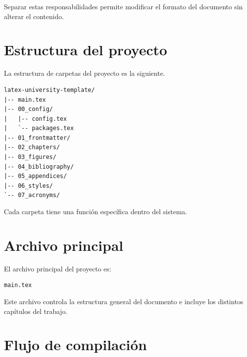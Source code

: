\begin{notebox}
Separar estas responsabilidades permite modificar el
formato del documento sin alterar el contenido.
\end{notebox}




\section{Estructura del proyecto}

La estructura de carpetas del proyecto es la siguiente.

\begin{lstlisting}[caption={Estructura de directorios del proyecto},label={code:projectstructure}]
latex-university-template/
|-- main.tex
|-- 00_config/
|   |-- config.tex
|   `-- packages.tex
|-- 01_frontmatter/
|-- 02_chapters/
|-- 03_figures/
|-- 04_bibliography/
|-- 05_appendices/
|-- 06_styles/
`-- 07_acronyms/
\end{lstlisting}


Cada carpeta tiene una función específica dentro del sistema.




\section{Archivo principal}

El archivo principal del proyecto es:

\begin{lstlisting}[caption={Archivo principal del documento},label={code:mainfile}]
main.tex
\end{lstlisting}


Este archivo controla la estructura general del documento
e incluye los distintos capítulos del trabajo.




\section{Flujo de compilación}

